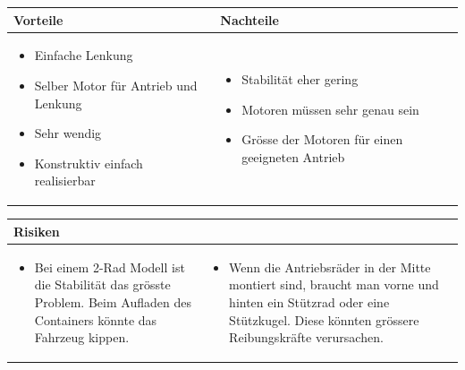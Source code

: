 \begin{table}[h]
\begin{tabular}{p{} | p{}}


 \textbf{Vorteile} & \textbf{Nachteile} \\ \hline
	 
\begin{itemize}
\item Einfache Lenkung
\item Selber Motor für Antrieb und Lenkung
\item Sehr wendig
\item Konstruktiv einfach realisierbar
\end{itemize}

 
 &
 
\begin{itemize}
\item Stabilität eher gering
\item Motoren müssen sehr genau sein
\item Grösse der Motoren für einen geeigneten Antrieb 
\end{itemize}

\end{tabular}
\end{table}

\begin{table}[h]
\begin{tabular}{p{}p{}}


 \textbf{Risiken} & \\ \hline
	 
\begin{itemize}
\item Bei einem 2-Rad Modell ist die Stabilität das grösste Problem. Beim Aufladen des Containers könnte das Fahrzeug kippen.
\end{itemize}
&
\begin{itemize}
\item Wenn die Antriebsräder in der Mitte montiert sind, braucht man vorne und hinten ein Stützrad oder eine Stützkugel. Diese könnten grössere Reibungskräfte verursachen.
\end{itemize}

 
\end{tabular}
\end{table}

\pagebreak